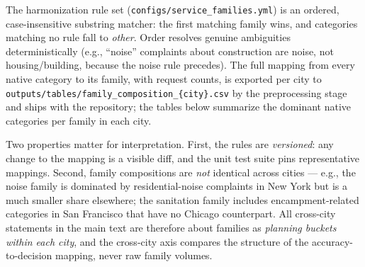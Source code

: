 The harmonization rule set (\texttt{configs/service\_families.yml}) is an
ordered, case-insensitive substring matcher: the first matching family
wins, and categories matching no rule fall to \emph{other}. Order
resolves genuine ambiguities deterministically (e.g., ``noise''
complaints about construction are noise, not housing/building, because
the noise rule precedes). The full mapping from every native category to
its family, with request counts, is exported per city to
\texttt{outputs/tables/family\_composition\_\{city\}.csv} by the
preprocessing stage and ships with the repository; the tables below
summarize the dominant native categories per family in each city.

Two properties matter for interpretation. First, the rules are
\emph{versioned}: any change to the mapping is a visible diff, and the
unit test suite pins representative mappings. Second, family
compositions are \emph{not} identical across cities --- e.g., the noise
family is dominated by residential-noise complaints in New York but is a
much smaller share elsewhere; the sanitation family includes
encampment-related categories in San Francisco that have no Chicago
counterpart. All cross-city statements in the main text are therefore
about families as \emph{planning buckets within each city}, and the
cross-city axis compares the structure of the accuracy-to-decision
mapping, never raw family volumes.


